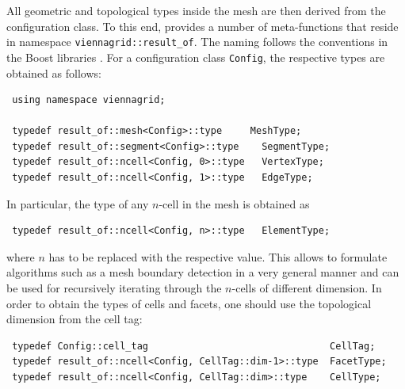 All geometric and topological types inside the mesh are then derived from the configuration class. To this end, {\ViennaGrid} provides
a number of meta-functions that reside in namespace \lstinline|viennagrid::result_of|. The naming follows the conventions in the Boost libraries \cite{boost}.
For a configuration class \lstinline|Config|, the respective types are obtained as follows:
\begin{lstlisting}
 using namespace viennagrid;

 typedef result_of::mesh<Config>::type     MeshType;
 typedef result_of::segment<Config>::type    SegmentType;
 typedef result_of::ncell<Config, 0>::type   VertexType;
 typedef result_of::ncell<Config, 1>::type   EdgeType;
\end{lstlisting}
In particular, the type of any $n$-cell in the mesh is obtained as
\begin{lstlisting}
 typedef result_of::ncell<Config, n>::type   ElementType;
\end{lstlisting}
where $n$ has to be replaced with the respective value. This allows to formulate algorithms such as a mesh boundary detection in a very general manner and can be used for recursively iterating through the $n$-cells of different dimension. In order to obtain the types of cells and facets, one should use the topological dimension from the cell tag:
\begin{lstlisting}
 typedef Config::cell_tag                                CellTag;
 typedef result_of::ncell<Config, CellTag::dim-1>::type  FacetType;
 typedef result_of::ncell<Config, CellTag::dim>::type    CellType;
\end{lstlisting}


